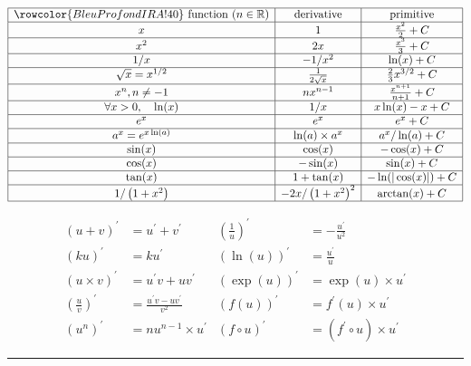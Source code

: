 \begin{f}
\renewcommand{\arraystretch}{1.5}
\[
\begin{array}{|c|c|c|}
\hline \rowcolor{BleuProfondIRA!40} \text { function }(n \in \mathbb{R}) & \text { derivative } & \text { primitive } \\
\hline x & 1 & \frac{x^2}{2}+C \\
\hline x^2 & 2 x & \frac{x^3}{3}+C \\
\hline 1 / x & -1 / x^2 & \ln (x)+C \\
\hline \sqrt{x}=x^{1 / 2} & \frac{1}{2 \sqrt{x}} & \frac{2}{3} x^{3 / 2}+C \\
\hline x^n, n \neq-1 & n x^{n-1} & \frac{x^{n+1}}{n+1}+C \\
\hline \forall x>0, \quad \ln (x) & 1 / x & x \ln (x)-x+C \\
\hline e^x & e^x & e^x+C \\
\hline a^x=e^{x \ln (a)} & \ln (a) \times a^x & a^x / \ln (a)+C \\
\hline \sin (x) & \cos (x) & -\cos (x)+C \\
\hline \cos (x) & -\sin (x) & \sin (x)+C \\
\hline \tan (x) & 1+\tan (x) & -\ln (|\cos (x)|)+C \\
\hline 1 /\left(1+x^2\right) & -2 x /\left(1+x^2\right)^2 & \arctan (x)+C \\
\hline
\end{array}
\]
\renewcommand{\arraystretch}{1}

\[
    \begin{array}{rl|rl}
(u+v)^{\prime} & =u^{\prime}+v^{\prime} & \left(\frac{1}{u}\right)^{\prime} & =-\frac{u^{\prime}}{u^2} \\
(k u)^{\prime} & =k u^{\prime} & (\ln (u))^{\prime} & =\frac{u^{\prime}}{u} \\
(u \times v)^{\prime} & =u^{\prime} v+u v^{\prime} & (\exp (u))^{\prime} & =\exp (u) \times u^{\prime} \\
\left(\frac{u}{v}\right)^{\prime} & =\frac{u^{\prime} v-u v^{\prime}}{v^2} & (f(u))^{\prime} & =f^{\prime}(u) \times u^{\prime} \\
\left(u^n\right)^{\prime} & =n u^{n-1} \times u^{\prime} & (f \circ u)^{\prime} & =\left(f^{\prime} \circ u\right) \times u^{\prime}
\end{array}
\]
\end{f}

\hrule

